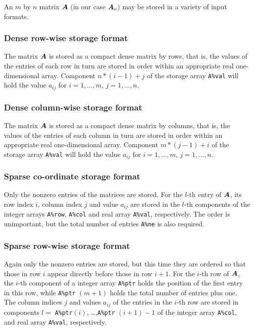 \documentclass{galahad}
\begin{document}

\galmatrix
An $m$ by $n$ matrix ${\bm{A}}$ (in our case ${\bm{A}}_o$)
may be stored in a variety of input formats.

\subsubsection{Dense row-wise storage format}\label{dense}
The matrix ${\bm{A}}$ is stored as a compact
dense matrix by rows, that is, the values of the entries of each row in turn are
stored in order within an appropriate real one-dimensional array.
Component $n \ast (i-1) + j$ of the storage array {\tt A\%val} will hold the
value $a_{ij}$ for $i = 1, \ldots , m$, $j = 1, \ldots , n$.

\subsubsection{Dense column-wise storage format}\label{densecolumnwise}
The matrix ${\bm{A}}$ is stored as a compact
dense matrix by columns, that is, the values of the entries of each column
in turn are stored in order within an appropriate real one-dimensional array.
Component $m \ast (j-1) + i$ of the storage array {\tt A\%val} will hold the
value $a_{ij}$ for $i = 1, \ldots , m$, $j = 1, \ldots , n$.

\subsubsection{Sparse co-ordinate storage format}\label{coordinate}
Only the nonzero entries of the matrices are stored. For the
$l$-th entry of ${\bm{A}}$, its row index $i$, column index $j$
and value $a_{ij}$
are stored in the $l$-th components of the integer arrays {\tt A\%row},
{\tt A\%col} and real array {\tt A\%val}, respectively.
The order is unimportant, but the total
number of entries {\tt A\%ne} is also required.

\subsubsection{Sparse row-wise storage format}\label{rowwise}
Again only the nonzero entries are stored, but this time
they are ordered so that those in row $i$ appear directly before those
in row $i+1$. For the $i$-th row of ${\bm{A}}$, the $i$-th component of a
integer array {\tt A\%ptr} holds the position of the first entry in this row,
while {\tt A\%ptr} $(m+1)$ holds the total number of entries plus one.
The column indices $j$ and values $a_{ij}$ of the entries in the $i$-th row
are stored in components
$l =$ {\tt A\%ptr}$(i)$, \ldots ,{\tt A\%ptr} $(i+1)-1$ of the
integer array {\tt A\%col}, and real array {\tt A\%val}, respectively.
\end{document}

